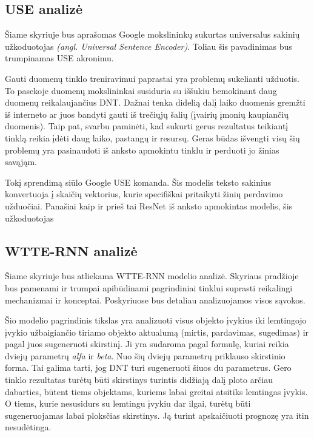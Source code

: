 \documentclass{VUMIFPSkursinis}
\begin{document}
\subsection{USE analizė}

Šiame skyriuje bus aprašomas Google mokslininkų sukurtas universalus sakinių užkoduotojas \textit{(angl. Universal Sentence Encoder)}. Toliau šis pavadinimas bus trumpinamas USE akronimu.  

Gauti duomenų tinklo treniravimui paprastai yra problemų sukelianti užduotis. To pasekoje duomenų mokslininkai susiduria su iššukiu bemokinant daug duomenų reikalaujančius DNT. Dažnai tenka didelią dalį laiko duomenis gremžti iš interneto ar juos bandyti gauti iš trečiųjų šalių (įvairių įmonių kaupiančių duomenis). Taip pat, svarbu paminėti, kad sukurti gerus rezultatus teikiantį tinklą reikia įdėti daug laiko, pastangų ir resursų. Geras būdas išvengti visų šių problemų yra pasinaudoti iš anksto apmokintu tinklu ir perduoti jo žinias savąjąm. 

Tokį sprendimą siūlo Google USE komanda. Šis modelis teksto sakinius konvertuoja į skaičių vektorius, kurie specifiškai pritaikyti žinių perdavimo užduočiai. Panašiai kaip ir prieš tai ResNet iš anksto apmokintas modelis, šis užkoduotojas 

\subsection{WTTE-RNN analizė}

Šiame skyriuje bus atliekama WTTE-RNN modelio analizė. Skyriaus pradžioje bus pamenami ir trumpai apibūdinami pagrindiniai tinklui suprasti reikalingi mechanizmai ir konceptai. Poskyriuose bus detaliau analizuojamos visos sąvokos. 

Šio modelio pagrindinis tikslas yra analizuoti visus objekto įvykius iki lemtingojo įvykio užbaigiančio tiriamo objekto aktualumą (mirtis, pardavimas, sugedimas) ir pagal juos sugeneruoti skirstinį. Ji yra sudaroma pagal formulę, kuriai reikia dviejų parametrų \textit{alfa} ir \textit{beta}. Nuo šių dviejų parametrų priklauso skirstinio forma. Tai galima tarti, jog DNT turi sugeneruoti šiuos du parametrus. Gero tinklo rezultatas turėtų būti skirstinys turintis didžiają dalį ploto arčiau dabarties, būtent tiems objektams, kuriems labai greitai atsitiks lemtingas įvykis. O tiems, kurie nesusidurs su lemtingu įvykiu dar ilgai, turėtų būti sugeneruojamas labai ploksčias skirstinys. Ją turint apskaičiuoti prognozę yra itin nesudėtinga.
\end{document}
